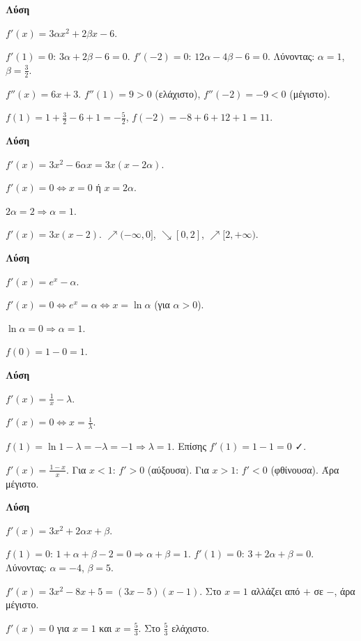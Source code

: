 \documentclass[11pt,a4paper,modern]{FFExercises}
\begin{document}
\askhsh %
\textbf{Λύση}
\begin{alist}
    \item $f'(x) = 3\alpha x^2 + 2\beta x - 6$.
    \item $f'(1) = 0$: $3\alpha + 2\beta - 6 = 0$. $f'(-2) = 0$: $12\alpha - 4\beta - 6 = 0$. Λύνοντας: $\alpha = 1$, $\beta = \frac{3}{2}$.
    \item $f''(x) = 6x + 3$. $f''(1) = 9 > 0$ (ελάχιστο), $f''(-2) = -9 < 0$ (μέγιστο).
    \item $f(1) = 1 + \frac{3}{2} - 6 + 1 = -\frac{5}{2}$, $f(-2) = -8 + 6 + 12 + 1 = 11$.
\end{alist}

\askhsh %
\textbf{Λύση}
\begin{alist}
    \item $f'(x) = 3x^2 - 6\alpha x = 3x(x - 2\alpha)$.
    \item $f'(x) = 0 \Leftrightarrow x = 0$ ή $x = 2\alpha$.
    \item $2\alpha = 2 \Rightarrow \alpha = 1$.
    \item $f'(x) = 3x(x-2)$. $\nearrow(-\infty, 0]$, $\searrow[0, 2]$, $\nearrow[2, +\infty)$.
\end{alist}

\askhsh %
\textbf{Λύση}
\begin{alist}
    \item $f'(x) = e^x - \alpha$.
    \item $f'(x) = 0 \Leftrightarrow e^x = \alpha \Leftrightarrow x = \ln \alpha$ (για $\alpha > 0$).
    \item $\ln \alpha = 0 \Rightarrow \alpha = 1$.
    \item $f(0) = 1 - 0 = 1$.
\end{alist}

\askhsh %
\textbf{Λύση}
\begin{alist}
    \item $f'(x) = \frac{1}{x} - \lambda$.
    \item $f'(x) = 0 \Leftrightarrow x = \frac{1}{\lambda}$.
    \item $f(1) = \ln 1 - \lambda = -\lambda = -1 \Rightarrow \lambda = 1$. Επίσης $f'(1) = 1 - 1 = 0$ ✓.
    \item $f'(x) = \frac{1-x}{x}$. Για $x < 1$: $f' > 0$ (αύξουσα). Για $x > 1$: $f' < 0$ (φθίνουσα). Άρα μέγιστο.
\end{alist}

\askhsh %
\textbf{Λύση}
\begin{alist}
    \item $f'(x) = 3x^2 + 2\alpha x + \beta$.
    \item $f(1) = 0$: $1 + \alpha + \beta - 2 = 0 \Rightarrow \alpha + \beta = 1$. $f'(1) = 0$: $3 + 2\alpha + \beta = 0$. Λύνοντας: $\alpha = -4$, $\beta = 5$.
    \item $f'(x) = 3x^2 - 8x + 5 = (3x-5)(x-1)$. Στο $x=1$ αλλάζει από $+$ σε $-$, άρα μέγιστο.
    \item $f'(x) = 0$ για $x = 1$ και $x = \frac{5}{3}$. Στο $\frac{5}{3}$ ελάχιστο.
\end{alist}
\end{document}

